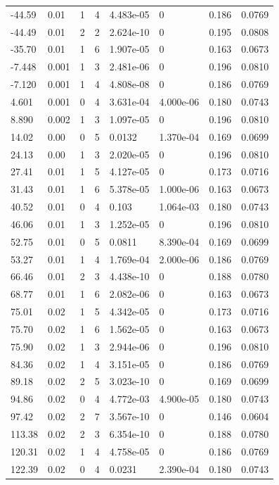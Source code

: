 \documentclass[preview]{standalone}
\begin{document}
{{\begin{tabular}{L{1.2cm}C{1.2cm} C{0.3cm}C{0.5cm} C{1.4cm}C{1.4cm} C{1.4cm}C{1.4cm}}
  -44.59  &  0.01  & 1     &  4 &  4.483e-05  & 0  & 0.186 &  0.0769   \\ 
  -44.49  &  0.01  & 2     &  2 &  2.624e-10  & 0  & 0.195 &  0.0808   \\ 
  -35.70  &  0.01  & 1     &  6 &  1.907e-05  & 0  & 0.163 &  0.0673   \\ 
  -7.448  &  0.001  & 1     &  3 &  2.481e-06  & 0  & 0.196 &  0.0810   \\ 
  -7.120  &  0.001  & 1     &  4 &  4.808e-08  & 0  & 0.186 &  0.0769   \\ 
  4.601  &  0.001  & 0     &  4 &  3.631e-04  & 4.000e-06  & 0.180 &  0.0743   \\ 
  8.890  &  0.002  & 1     &  3 &  1.097e-05  & 0  & 0.196 &  0.0810   \\ 
  14.02  &  0.00  & 0     &  5 &  0.0132  & 1.370e-04  & 0.169 &  0.0699   \\ 
  24.13  &  0.00  & 1     &  3 &  2.020e-05  & 0  & 0.196 &  0.0810   \\ 
  27.41  &  0.01  & 1     &  5 &  4.127e-05  & 0  & 0.173 &  0.0716   \\ 
  31.43  &  0.01  & 1     &  6 &  5.378e-05  & 1.000e-06  & 0.163 &  0.0673   \\ 
  40.52  &  0.01  & 0     &  4 &  0.103  & 1.064e-03  & 0.180 &  0.0743   \\ 
  46.06  &  0.01  & 1     &  3 &  1.252e-05  & 0  & 0.196 &  0.0810   \\ 
  52.75  &  0.01  & 0     &  5 &  0.0811  & 8.390e-04  & 0.169 &  0.0699   \\ 
  53.27  &  0.01  & 1     &  4 &  1.769e-04  & 2.000e-06  & 0.186 &  0.0769   \\ 
  66.46  &  0.01  & 2     &  3 &  4.438e-10  & 0  & 0.188 &  0.0780   \\ 
  68.77  &  0.01  & 1     &  6 &  2.082e-06  & 0  & 0.163 &  0.0673   \\ 
  75.01  &  0.02  & 1     &  5 &  4.342e-05  & 0  & 0.173 &  0.0716   \\ 
  75.70  &  0.02  & 1     &  6 &  1.562e-05  & 0  & 0.163 &  0.0673   \\ 
  75.90  &  0.02  & 1     &  3 &  2.944e-06  & 0  & 0.196 &  0.0810   \\ 
  84.36  &  0.02  & 1     &  4 &  3.151e-05  & 0  & 0.186 &  0.0769   \\ 
  89.18  &  0.02  & 2     &  5 &  3.023e-10  & 0  & 0.169 &  0.0699   \\ 
  94.86  &  0.02  & 0     &  4 &  4.772e-03  & 4.900e-05  & 0.180 &  0.0743   \\ 
  97.42  &  0.02  & 2     &  7 &  3.567e-10  & 0  & 0.146 &  0.0604   \\ 
  113.38  &  0.02  & 2     &  3 &  6.354e-10  & 0  & 0.188 &  0.0780   \\ 
  120.31  &  0.02  & 1     &  4 &  4.758e-05  & 0  & 0.186 &  0.0769   \\ 
  122.39  &  0.02  & 0     &  4 &  0.0231  & 2.390e-04  & 0.180 &  0.0743   \\ 
\hline 
\end{tabular} 

}}
\end{document}
